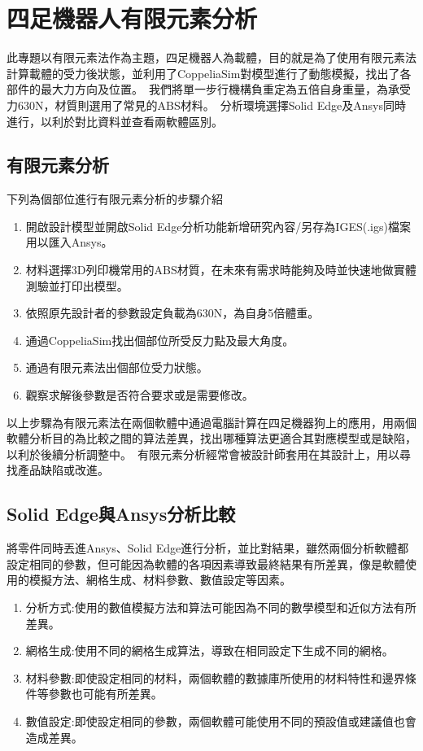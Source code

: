 \chapter{四足機器人有限元素分析}

此專題以有限元素法作為主題，四足機器人為載體，目的就是為了使用有限元素法計算載體的受力後狀態，並利用了CoppeliaSim對模型進行了動態模擬，找出了各部件的最大力方向及位置。\
我們將單一步行機構負重定為五倍自身重量，為承受力630N，材質則選用了常見的ABS材料。\
分析環境選擇Solid Edge及Ansys同時進行，以利於對比資料並查看兩軟體區別。\\

\section{有限元素分析}
下列為個部位進行有限元素分析的步驟介紹
\begin{enumerate}
\item 開啟設計模型並開啟Solid Edge分析功能新增研究內容/另存為IGES(.igs)檔案用以匯入Ansys。
\item 材料選擇3D列印機常用的ABS材質，在未來有需求時能夠及時並快速地做實體測驗並打印出模型。
\item 依照原先設計者的參數設定負載為630N，為自身5倍體重。
\item 通過CoppeliaSim找出個部位所受反力點及最大角度。
\item 通過有限元素法出個部位受力狀態。
\item 觀察求解後參數是否符合要求或是需要修改。\\

\end{enumerate}
以上步驟為有限元素法在兩個軟體中通過電腦計算在四足機器狗上的應用，用兩個軟體分析目的為比較之間的算法差異，找出哪種算法更適合其對應模型或是缺陷，以利於後續分析調整中。\
有限元素分析經常會被設計師套用在其設計上，用以尋找產品缺陷或改進。\
\newpage
\section{Solid Edge與Ansys分析比較}
將零件同時丟進Ansys、Solid Edge進行分析，並比對結果，雖然兩個分析軟體都設定相同的參數，但可能因為軟體的各項因素導致最終結果有所差異，像是軟體使用的模擬方法、網格生成、材料參數、數值設定等因素。\\

\begin{enumerate}
\item 分析方式:使用的數值模擬方法和算法可能因為不同的數學模型和近似方法有所差異。
\item 網格生成:使用不同的網格生成算法，導致在相同設定下生成不同的網格。
\item 材料參數:即使設定相同的材料，兩個軟體的數據庫所使用的材料特性和邊界條件等參數也可能有所差異。
\item	數值設定:即使設定相同的參數，兩個軟體可能使用不同的預設值或建議值也會造成差異。\\

\end{enumerate}

